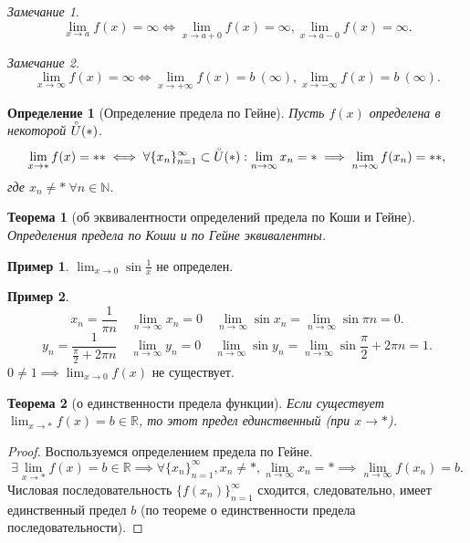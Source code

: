 \documentclass[a4paper,12pt]{article} %
\newtheorem{definition}{Определение}[section]
\newtheorem{theorem}{Теорема}[section]
\theoremstyle{remark}
\newtheorem{remark}{Замечание}[theorem]
\theoremstyle{definition}
\newtheorem{exmp}{Пример}[section]
\begin{document}
\begin{remark}
		\[
		\lim_{x \to a} f(x) = \infty \iff \lim_{x \to a+0} f(x) = \infty, \lim_{x \to a-0} f(x) = \infty
		.\] 
\end{remark}
\begin{remark}
	\[
		\lim_{x \to \infty} f(x) = \infty \iff \lim_{x \to +\infty} f(x) = b \ (\infty), \lim_{x \to -\infty} f(x) = b \ (\infty)
	.\] 
\end{remark}

\begin{definition}[Определение предела по Гейне]
	Пусть $f(x)$ определена в некоторой $\accentset{\circ}{U}(*)$.
	\[
	\lim_{x \to *} f(x) = ** \iff \forall \{x_n\}_{n=1}^{\infty} \subset \accentset{\circ}{U}(*) :
    \lim_{n \to \infty} x_n = * \implies \lim_{n \to \infty} f(x_n) = **,
	\]
где $x_n \neq * \ \forall n\in \mathbb{N}$.
\end{definition}

\begin{theorem}[об эквивалентности определений предела по Коши и Гейне]
	Определения предела по Коши и по Гейне эквивалентны.
\end{theorem}

\begin{exmp}
	$\displaystyle \lim_{x \to 0} \sin{\frac{1}{x}}$ не определен.
\end{exmp}

\begin{exmp}
	\[ x_n = \frac{1}{\pi n} \quad \lim_{n \to \infty} x_n = 0 \quad \lim_{n \to \infty} \sin{x_n} 
    = \lim_{n \to \infty} \sin{\pi n} = 0 .\] 
	\[ y_n = \frac{1}{\frac{\pi}{2} + 2\pi n} \quad \lim_{n \to \infty} y_n = 0 \quad \lim_{n \to \infty} \sin{y_n} =
    \lim_{n \to \infty} \sin{\frac{\pi}{2} + 2\pi n} = 1 .\] 
	$\displaystyle 0 \neq 1 \implies \lim_{x \to 0} f(x)$ не существует.
\end{exmp}


\begin{theorem}[о единственности предела функции]
	Если существует $\lim_{x \to *} f(x) = b \in  \mathbb{R}$, то этот предел единственный (при $x \to *$).
\end{theorem}
\begin{proof}
	Воспользуемся определением предела по Гейне.
	\[
	\exists  \lim_{x \to *} f(x) = b \in \mathbb{R} \implies \forall \{x_n\}_{n=1}^{\infty}, x_n \neq  *, \lim_{n \to \infty} x_n = * \implies \lim_{n \to \infty} f(x_n) = b
	.\] 
	 Числовая последовательность $\{f(x_n)\}_{n=1}^{\infty}$ сходится, следовательно, имеет единственный предел $b$ (по теореме о единственности предела последовательности). 
\end{proof}
\end{document}
